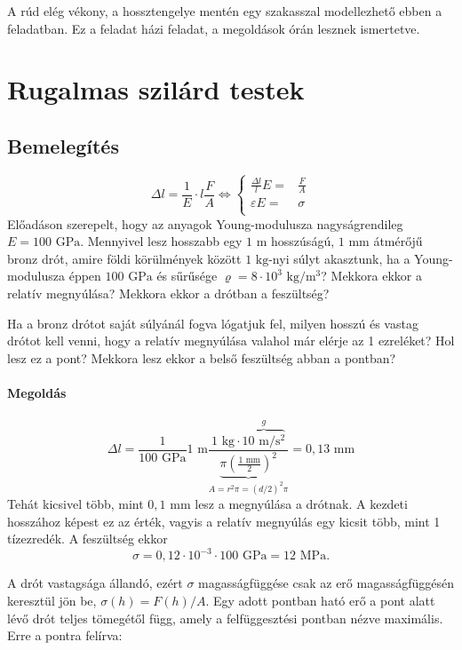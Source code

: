 \documentclass[12pt,a4paper]{scrartcl}
\begin{document}
A rúd elég vékony, a hossztengelye mentén egy szakasszal modellezhető ebben a feladatban. Ez a feladat házi feladat, a megoldások órán lesznek ismertetve.

\section{Rugalmas szilárd testek}
\subsection{Bemelegítés}
\[\Delta l = \frac{1}{E} \cdot l\frac{F}{A} \Leftrightarrow \left\{ \begin{aligned}
  \frac{{\Delta l}}{l}E =  & \frac{F}{A} \\ 
  \varepsilon E =  & \sigma  \\ 
\end{aligned}  \right.\]
Előadáson szerepelt, hogy az anyagok Young-modulusza nagyságrendileg $E = 100{\text{ GPa}}$. Mennyivel lesz hosszabb egy $1{\text{ m}}$ hosszúságú, $1{\text{ mm}}$ átmérőjű bronz drót, amire földi körülmények között $1{\text{ kg}}$-nyi súlyt akasztunk, ha a Young-modulusza éppen $100{\text{ GPa}}$ és sűrűsége $\varrho  = 8 \cdot {10^3}{\text{ kg/}}{{\text{m}}^{\text{3}}}$? Mekkora ekkor a relatív megnyúlása? Mekkora ekkor a drótban a feszültség? 

Ha a bronz drótot saját súlyánál fogva lógatjuk fel, milyen hosszú és vastag drótot kell venni, hogy a relatív megnyúlása valahol már elérje az 1 ezreléket? Hol lesz ez a pont? Mekkora lesz ekkor a belső feszültség abban a pontban?

\paragraph{Megoldás}
\[\Delta l = \frac{1}{{100{\text{ GPa}}}}1{\text{ m}}\frac{{1{\text{ kg}} \cdot \overbrace {10{\text{ m}}/{{\text{s}}^2}}^g}}{{\underbrace {\pi {{\left( {\frac{{1{\text{ mm}}}}{2}} \right)}^2}}_{A = {r^2}\pi  = {{\left( {d/2} \right)}^2}\pi }}} = 0{,}13{\text{ mm}}\]
Tehát kicsivel több, mint $0,1\text{ mm}$ lesz a megnyúlása a drótnak. A kezdeti hosszához képest ez az érték, vagyis a relatív megnyúlás egy kicsit több, mint 1 tízezredék. A feszültség ekkor
\[\sigma  = 0,12 \cdot {10^{ - 3}} \cdot 100{\text{ GPa}} = 12{\text{ MPa}}.\]

A drót vastagsága állandó, ezért $\sigma $ magasságfüggése csak az erő magasságfüggésén keresztül jön be, $\sigma \left( h \right) = F\left( h \right)/A$. Egy adott pontban ható erő a pont alatt lévő drót teljes tömegétől függ, amely a felfüggesztési pontban nézve maximális. Erre a pontra felírva: 
\end{document}
